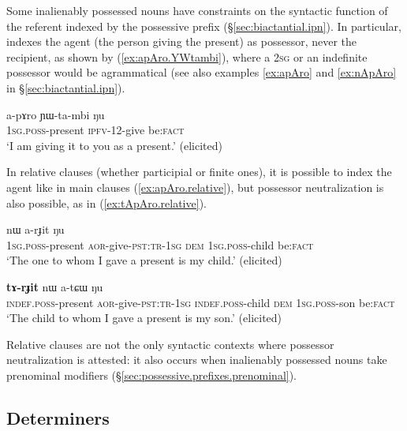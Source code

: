 Some inalienably possessed nouns have constraints on the syntactic function of the referent indexed by the possessive prefix (§\ref{sec:biactantial.ipn}). In particular,  indexes the agent (the person giving the present) as possessor, never the recipient, as shown by (\ref{ex:apAro.YWtambi}), where a \textsc{2sg}  or an indefinite possessor  would be agrammatical (see also examples \ref{ex:apAro} and \ref{ex:nApAro} in §\ref{sec:biactantial.ipn}).
	
\begin{exe}
\ex \label{ex:apAro.YWtambi}
\gll a-pɤro ɲɯ-ta-mbi ŋu \\
\textsc{1sg}.\textsc{poss}-present \textsc{ipfv}-1\fl{}2-give be:\textsc{fact} \\
\glt `I am giving it to you as a present.' (elicited)
\end{exe} 
	 
In relative clauses (whether participial or finite ones), it is possible to index the agent like in main clauses (\ref{ex:apAro.relative}), but  possessor neutralization is also possible, as in (\ref{ex:tApAro.relative}).

\begin{exe}
\ex \label{ex:apAro.relative}
 nɯ a-rɟit ŋu  \\
	\textsc{1sg}.\textsc{poss}-present \textsc{aor}-give-\textsc{pst}:\textsc{tr}-\textsc{1sg} \textsc{dem} \textsc{1sg}.\textsc{poss}-child be:\textsc{fact} \\
\glt `The one to whom I gave a present is my child.' (elicited)
\end{exe} 

\begin{exe}
\ex \label{ex:tApAro.relative}
 \textbf{tɤ-rɟit} nɯ a-tɕɯ ŋu \\
\textsc{indef}.\textsc{poss}-present \textsc{aor}-give-\textsc{pst}:\textsc{tr}-\textsc{1sg} 	\textsc{indef}.\textsc{poss}-child \textsc{dem} \textsc{1sg}.\textsc{poss}-son be:\textsc{fact} \\
\glt `The child to whom I gave a present is my son.' (elicited)
\end{exe} 

Relative clauses are not the only syntactic contexts where possessor neutralization is attested: it also occurs when inalienably possessed nouns take prenominal modifiers (§\ref{sec:possessive.prefixes.prenominal}).


\subsection{Determiners} \label{sec:relative.determiners}

